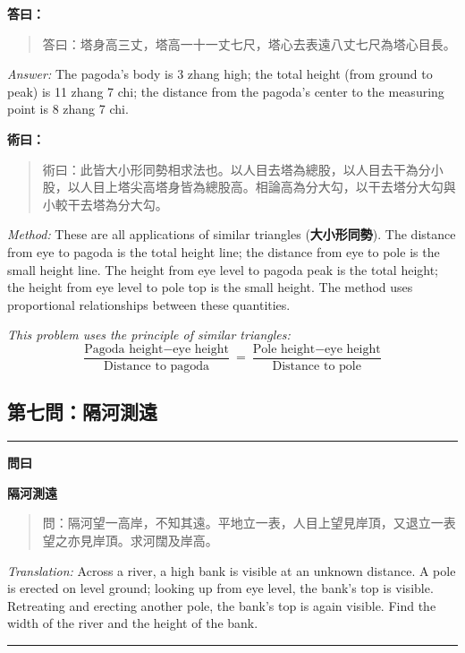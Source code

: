 \documentclass[11pt,a4paper]{article}
\newenvironment{problem}[1][]{%
  \medskip\noindent\rule{\textwidth}{0.4pt}%
  \par\noindent\textbf{\color{sectioncolor}#1}\par\nopagebreak%
  \smallskip%
}{%
  \par\noindent\rule{\textwidth}{0.4pt}\medskip%
}
\newenvironment{answer}{%
  \medskip\noindent{\color{answercolor}\rule{0.5\textwidth}{0.5pt}}%
  \par\color{answercolor}%
}{%
  \par\medskip%
}
\newenvironment{method}{%
  \medskip\noindent{\color{methodcolor}\rule{0.5\textwidth}{0.5pt}}%
  \par\color{methodcolor}%
}{%
  \par\medskip%
}
\begin{document}
\begin{answer}
\textbf{答曰：}

\begin{quote}
\textcolor{chinacolor}{%
答曰：塔身高三丈，塔高一十一丈七尺，塔心去表遠八丈七尺為塔心目長。
}
\end{quote}

\textit{Answer:} The pagoda's body is 3 zhang high; the total height 
(from ground to peak) is 11 zhang 7 chi; the distance from the pagoda's 
center to the measuring point is 8 zhang 7 chi.
\end{answer}

\begin{method}
\textbf{術曰：}

\begin{quote}
\textcolor{chinacolor}{%
術曰：此皆大小形同勢相求法也。以人目去塔為總股，以人目去干為分小股，以人目上塔尖高塔身皆為總股高。相論高為分大勾，以干去塔分大勾與小較干去塔為分大勾。
}
\end{quote}

\textit{Method:} These are all applications of similar triangles (\textbf{大小形同勢}). 
The distance from eye to pagoda is the total height line; the distance 
from eye to pole is the small height line. The height from eye level to 
pagoda peak is the total height; the height from eye level to pole top 
is the small height. The method uses proportional relationships between 
these quantities.

\medskip
\textit{This problem uses the principle of similar triangles:}
\[
\frac{\text{Pagoda height} - \text{eye height}}{\text{Distance to pagoda}} = 
\frac{\text{Pole height} - \text{eye height}}{\text{Distance to pole}}
\]
\end{method}

\subsection*{第七問：隔河測遠}

\begin{problem}[\textbf{問曰}]
\textbf{\color{sectioncolor}隔河測遠}

\begin{quote}
\textcolor{chinacolor}{%
問：隔河望一高岸，不知其遠。平地立一表，人目上望見岸頂，又退立一表望之亦見岸頂。求河闊及岸高。
}
\end{quote}

\textit{Translation:} Across a river, a high bank is visible at an unknown 
distance. A pole is erected on level ground; looking up from eye level, 
the bank's top is visible. Retreating and erecting another pole, the 
bank's top is again visible. Find the width of the river and the height 
of the bank.
\end{problem}
\end{document}
